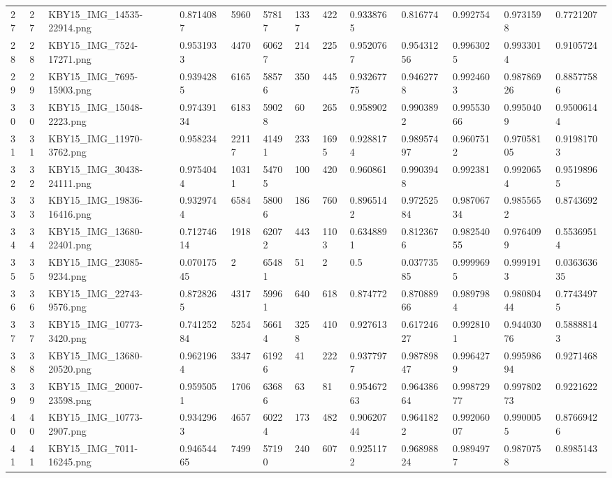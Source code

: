 \documentclass[11pt, a4paper, twoside]{report}
\begin{document}
\begin{longtable}[c]{@{}lllllllllllll@{}}
27 & 27 & KBY15\_IMG\_14535-22914.png & 0.8714087 & 5960 & 57817 & 1337 & 422 & 0.9338765 & 0.816774 & 0.992754 & 0.9731598 & 0.7721207 \\
28 & 28 & KBY15\_IMG\_7524-17271.png & 0.9531933 & 4470 & 60627 & 214 & 225 & 0.9520767 & 0.95431256 & 0.9963025 & 0.9933014 & 0.9105724 \\
29 & 29 & KBY15\_IMG\_7695-15903.png & 0.9394285 & 6165 & 58576 & 350 & 445 & 0.93267775 & 0.9462778 & 0.9924603 & 0.98786926 & 0.88577586 \\
30 & 30 & KBY15\_IMG\_15048-2223.png & 0.97439134 & 6183 & 59028 & 60 & 265 & 0.958902 & 0.9903892 & 0.99553066 & 0.9950409 & 0.95006144 \\
31 & 31 & KBY15\_IMG\_11970-3762.png & 0.958234 & 22117 & 41491 & 233 & 1695 & 0.9288174 & 0.98957497 & 0.9607512 & 0.97058105 & 0.91981703 \\
32 & 32 & KBY15\_IMG\_30438-24111.png & 0.9754044 & 10311 & 54705 & 100 & 420 & 0.960861 & 0.9903948 & 0.992381 & 0.9920654 & 0.95198965 \\
33 & 33 & KBY15\_IMG\_19836-16416.png & 0.9329744 & 6584 & 58006 & 186 & 760 & 0.8965142 & 0.97252584 & 0.98706734 & 0.9855652 & 0.8743692 \\
34 & 34 & KBY15\_IMG\_13680-22401.png & 0.71274614 & 1918 & 62072 & 443 & 1103 & 0.6348891 & 0.8123676 & 0.98254055 & 0.9764099 & 0.55369514 \\
35 & 35 & KBY15\_IMG\_23085-9234.png & 0.07017545 & 2 & 65481 & 51 & 2 & 0.5 & 0.03773585 & 0.9999695 & 0.9991913 & 0.036363635 \\
36 & 36 & KBY15\_IMG\_22743-9576.png & 0.8728265 & 4317 & 59961 & 640 & 618 & 0.874772 & 0.87088966 & 0.9897984 & 0.98080444 & 0.77434975 \\
37 & 37 & KBY15\_IMG\_10773-3420.png & 0.74125284 & 5254 & 56614 & 3258 & 410 & 0.927613 & 0.61724627 & 0.9928101 & 0.94403076 & 0.58888143 \\
38 & 38 & KBY15\_IMG\_13680-20520.png & 0.9621964 & 3347 & 61926 & 41 & 222 & 0.9377977 & 0.98789847 & 0.9964279 & 0.99598694 & 0.9271468 \\
39 & 39 & KBY15\_IMG\_20007-23598.png & 0.9595051 & 1706 & 63686 & 63 & 81 & 0.95467263 & 0.96438664 & 0.99872977 & 0.99780273 & 0.9221622 \\
40 & 40 & KBY15\_IMG\_10773-2907.png & 0.9342963 & 4657 & 60224 & 173 & 482 & 0.90620744 & 0.9641822 & 0.99206007 & 0.9900055 & 0.87669426 \\
41 & 41 & KBY15\_IMG\_7011-16245.png & 0.94654465 & 7499 & 57190 & 240 & 607 & 0.9251172 & 0.96898824 & 0.9894977 & 0.9870758 & 0.8985143 \\

\end{longtable}
\end{document}
